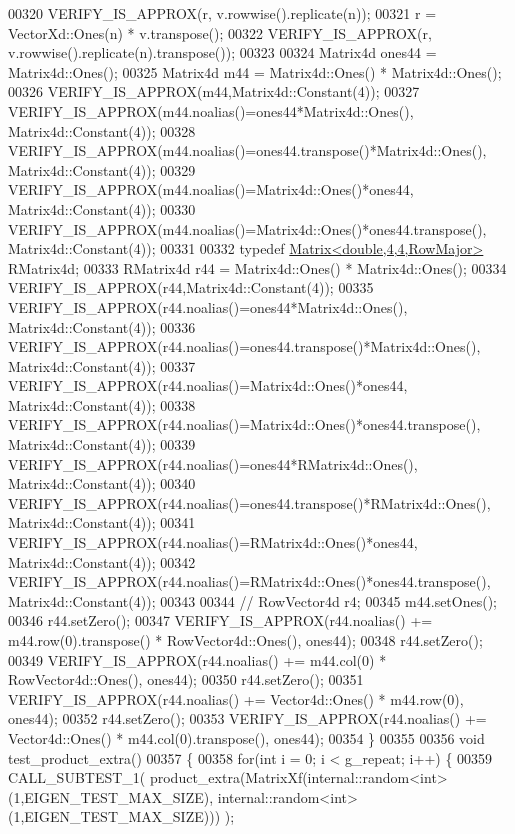\begin{DoxyCode}
00320   VERIFY\_IS\_APPROX(r, v.rowwise().replicate(n));
00321   r = VectorXd::Ones(n) * v.transpose();
00322   VERIFY\_IS\_APPROX(r, v.rowwise().replicate(n).transpose());
00323 
00324   Matrix4d ones44 = Matrix4d::Ones();
00325   Matrix4d m44 = Matrix4d::Ones() * Matrix4d::Ones();
00326   VERIFY\_IS\_APPROX(m44,Matrix4d::Constant(4));
00327   VERIFY\_IS\_APPROX(m44.noalias()=ones44*Matrix4d::Ones(), Matrix4d::Constant(4));
00328   VERIFY\_IS\_APPROX(m44.noalias()=ones44.transpose()*Matrix4d::Ones(), Matrix4d::Constant(4));
00329   VERIFY\_IS\_APPROX(m44.noalias()=Matrix4d::Ones()*ones44, Matrix4d::Constant(4));
00330   VERIFY\_IS\_APPROX(m44.noalias()=Matrix4d::Ones()*ones44.transpose(), Matrix4d::Constant(4));
00331 
00332   \textcolor{keyword}{typedef} \hyperlink{group___core___module_class_eigen_1_1_matrix}{Matrix<double,4,4,RowMajor>} RMatrix4d;
00333   RMatrix4d r44 = Matrix4d::Ones() * Matrix4d::Ones();
00334   VERIFY\_IS\_APPROX(r44,Matrix4d::Constant(4));
00335   VERIFY\_IS\_APPROX(r44.noalias()=ones44*Matrix4d::Ones(), Matrix4d::Constant(4));
00336   VERIFY\_IS\_APPROX(r44.noalias()=ones44.transpose()*Matrix4d::Ones(), Matrix4d::Constant(4));
00337   VERIFY\_IS\_APPROX(r44.noalias()=Matrix4d::Ones()*ones44, Matrix4d::Constant(4));
00338   VERIFY\_IS\_APPROX(r44.noalias()=Matrix4d::Ones()*ones44.transpose(), Matrix4d::Constant(4));
00339   VERIFY\_IS\_APPROX(r44.noalias()=ones44*RMatrix4d::Ones(), Matrix4d::Constant(4));
00340   VERIFY\_IS\_APPROX(r44.noalias()=ones44.transpose()*RMatrix4d::Ones(), Matrix4d::Constant(4));
00341   VERIFY\_IS\_APPROX(r44.noalias()=RMatrix4d::Ones()*ones44, Matrix4d::Constant(4));
00342   VERIFY\_IS\_APPROX(r44.noalias()=RMatrix4d::Ones()*ones44.transpose(), Matrix4d::Constant(4));
00343 
00344 \textcolor{comment}{//   RowVector4d r4;}
00345   m44.setOnes();
00346   r44.setZero();
00347   VERIFY\_IS\_APPROX(r44.noalias() += m44.row(0).transpose() * RowVector4d::Ones(), ones44);
00348   r44.setZero();
00349   VERIFY\_IS\_APPROX(r44.noalias() += m44.col(0) * RowVector4d::Ones(), ones44);
00350   r44.setZero();
00351   VERIFY\_IS\_APPROX(r44.noalias() += Vector4d::Ones() * m44.row(0), ones44);
00352   r44.setZero();
00353   VERIFY\_IS\_APPROX(r44.noalias() += Vector4d::Ones() * m44.col(0).transpose(), ones44);
00354 \}
00355 
00356 \textcolor{keywordtype}{void} test\_product\_extra()
00357 \{
00358   \textcolor{keywordflow}{for}(\textcolor{keywordtype}{int} i = 0; i < g\_repeat; i++) \{
00359     CALL\_SUBTEST\_1( product\_extra(MatrixXf(internal::random<int>(1,EIGEN\_TEST\_MAX\_SIZE), 
      internal::random<int>(1,EIGEN\_TEST\_MAX\_SIZE))) );

\end{DoxyCode}
